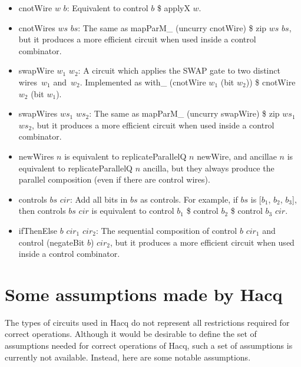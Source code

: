 \documentclass[11pt]{article}
\newcommand{\var}[1]{\mathit{#1}}
\begin{document}
\begin{itemize}
\item
  \textsf{cnotWire $\var{w}$ $\var{b}$}:
  Equivalent to \textsf{control $\var{b}$ \$ applyX $\var{w}$}.
\item
  \textsf{cnotWires $\var{ws}$ $\var{bs}$}:
  The same as \textsf{mapParM\_ (uncurry cnotWire) \$ zip $\var{ws}$ $\var{bs}$},
  but it produces a more efficient circuit when used inside a \textsf{control} combinator.
\item
  \textsf{swapWire $\var{w}_1$ $\var{w}_2$}:
  A circuit which applies the SWAP gate to two distinct wires~$\var{w}_1$ and~$\var{w}_2$.
  Implemented as \textsf{with\_ (cnotWire $\var{w}_1$ (bit $\var{w}_2$)) \$ cnotWire $\var{w}_2$ (bit $\var{w}_1$)}.
\item
  \textsf{swapWires $\var{ws}_1$ $\var{ws}_2$}:
  The same as \textsf{mapParM\_ (uncurry swapWire) \$ zip $\var{ws}_1$ $\var{ws}_2$},
  but it produces a more efficient circuit when used inside a \textsf{control} combinator.
\item
  \textsf{newWires $\var{n}$} is equivalent to \textsf{replicateParallelQ $\var{n}$ newWire},
  and \textsf{ancillae $\var{n}$} is equivalent to \textsf{replicateParallelQ $\var{n}$ ancilla},
  but they always produce the parallel composition (even if there are control wires).
\item
  \textsf{controls $\var{bs}$ $\var{cir}$}:
  Add all bits in $\var{bs}$ as controls.
  For example, if $\var{bs}$ is \textsf{[$\var{b}_1$, $\var{b}_2$, $\var{b}_3$]},
  then \textsf{controls $\var{bs}$ $\var{cir}$} is equivalent to
  \textsf{control $\var{b}_1$ \$ control $\var{b}_2$ \$ control $\var{b}_3$ $\var{cir}$}.
\item
  \textsf{ifThenElse $\var{b}$ $\var{cir}_1$ $\var{cir}_2$}:
  The sequential composition of
  \textsf{control $\var{b}$ $\var{cir}_1$} and
  \textsf{control (negateBit $\var{b}$) $\var{cir}_2$},
  but it produces a more efficient circuit when used inside a \textsf{control} combinator.
\end{itemize}

\section{Some assumptions made by Hacq}

The types of circuits used in Hacq do not represent
all restrictions required for correct operations.
Although it would be desirable to define the set of assumptions
needed for correct operations of Hacq,
such a set of assumptions is currently not available.
Instead, here are some notable assumptions.
\end{document}
